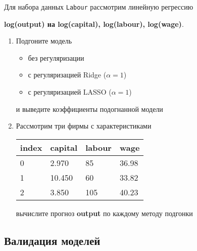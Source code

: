 \begin{exercise}
Для набора данных \texttt{Labour} рассмотрим линейную регрессию 
\begin{center}
	\textbf{log(output) на log(capital), log(labour), log(wage)}.
\end{center}
\begin{enumerate}
	\item Подгоните модель
	\begin{itemize}
		\item без регуляризации
		\item с регуляризацией Ridge (\(\alpha=1\))
		\item с регуляризацией LASSO (\(\alpha=1\))
	\end{itemize}
	и выведите коэффициенты подогнанной модели
	\item Рассмотрим три фирмы с характеристиками
	\begin{center}
		\begin{tabular}{|l||l|l|l|}\hline
			index & capital & labour & wage \\ \hline\hline
			0 & 2.970 & 85 & 36.98\\
			1 & 10.450 & 60 & 33.82  \\
			2 & 3.850 & 105 & 40.23\\ \hline
		\end{tabular}
	\end{center}
	вычислите прогноз \textbf{output} по каждому методу подгонки
\end{enumerate}
\end{exercise}


\subsection{Валидация моделей}

